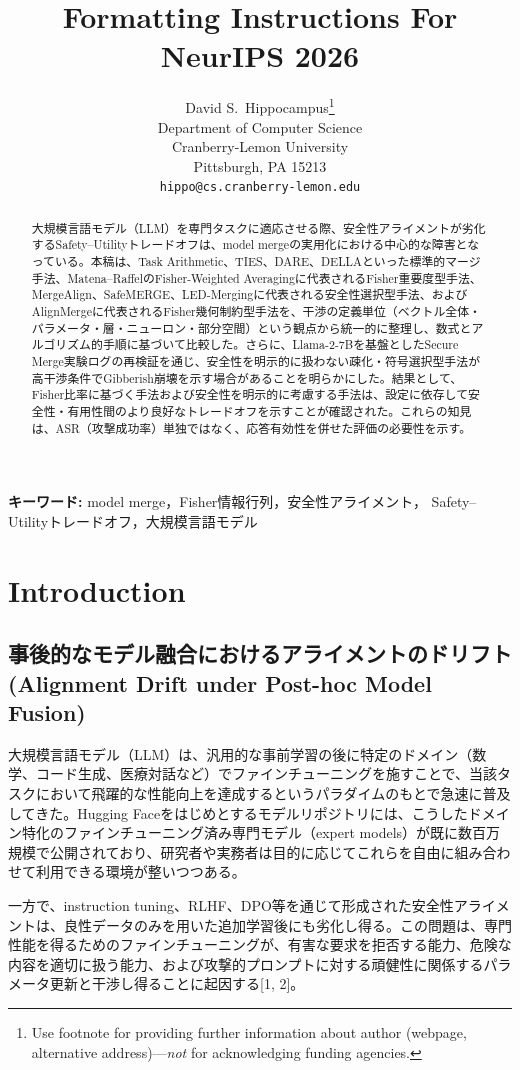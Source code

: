 \documentclass{article}
\title{Formatting Instructions For NeurIPS 2026}
\author{%
  David S.~Hippocampus\thanks{Use footnote for providing further information
    about author (webpage, alternative address)---\emph{not} for acknowledging
    funding agencies.} \\
  Department of Computer Science\\
  Cranberry-Lemon University\\
  Pittsburgh, PA 15213 \\
  \texttt{hippo@cs.cranberry-lemon.edu} \\
}
\begin{document}
\maketitle


\begin{abstract}
大規模言語モデル（LLM）を専門タスクに適応させる際、安全性アライメントが劣化するSafety–Utilityトレードオフは、model mergeの実用化における中心的な障害となっている。本稿は、Task Arithmetic、TIES、DARE、DELLAといった標準的マージ手法、Matena–RaffelのFisher-Weighted Averagingに代表されるFisher重要度型手法、MergeAlign、SafeMERGE、LED-Mergingに代表される安全性選択型手法、およびAlignMergeに代表されるFisher幾何制約型手法を、干渉の定義単位（ベクトル全体・パラメータ・層・ニューロン・部分空間）という観点から統一的に整理し、数式とアルゴリズム的手順に基づいて比較した。さらに、Llama-2-7Bを基盤としたSecure Merge実験ログの再検証を通じ、安全性を明示的に扱わない疎化・符号選択型手法が高干渉条件でGibberish崩壊を示す場合があることを明らかにした。結果として、Fisher比率に基づく手法および安全性を明示的に考慮する手法は、設定に依存して安全性・有用性間のより良好なトレードオフを示すことが確認された。これらの知見は、ASR（攻撃成功率）単独ではなく、応答有効性を併せた評価の必要性を示す。
\end{abstract}
\noindent\textbf{キーワード: }
model merge，Fisher情報行列，安全性アライメント，
Safety--Utilityトレードオフ，大規模言語モデル


\section{Introduction}
\subsection{事後的なモデル融合におけるアライメントのドリフト(Alignment Drift under Post-hoc Model Fusion)
}
大規模言語モデル（LLM）は、汎用的な事前学習の後に特定のドメイン（数学、コード生成、医療対話など）でファインチューニングを施すことで、当該タスクにおいて飛躍的な性能向上を達成するというパラダイムのもとで急速に普及してきた。Hugging Faceをはじめとするモデルリポジトリには、こうしたドメイン特化のファインチューニング済み専門モデル（expert models）が既に数百万規模で公開されており、研究者や実務者は目的に応じてこれらを自由に組み合わせて利用できる環境が整いつつある。

一方で、instruction tuning、RLHF、DPO等を通じて形成された安全性アライメントは、良性データのみを用いた追加学習後にも劣化し得る。この問題は、専門性能を得るためのファインチューニングが、有害な要求を拒否する能力、危険な内容を適切に扱う能力、および攻撃的プロンプトに対する頑健性に関係するパラメータ更新と干渉し得ることに起因する[1, 2]。
\end{document}
